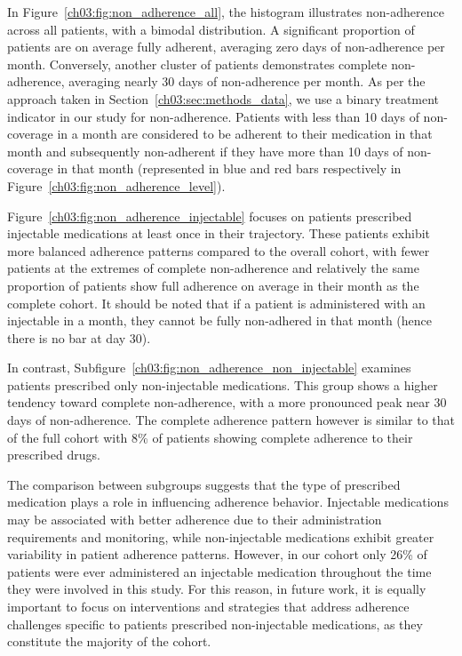 In Figure~\ref{ch03:fig:non_adherence_all}, the histogram illustrates non-adherence across all patients, with a bimodal distribution.
A significant proportion of patients are on average fully adherent, averaging zero days of non-adherence per month.
Conversely, another cluster of patients demonstrates complete non-adherence, averaging nearly 30 days of non-adherence per month.
As per the approach taken in Section~\ref{ch03:sec:methods_data}, we use a binary treatment indicator in our study for non-adherence. 
Patients with less than 10 days of non-coverage in a month are considered to be adherent to their medication in that month and subsequently non-adherent if they have more than 10 days of non-coverage in that month (represented in blue and red bars respectively in Figure~\ref{ch03:fig:non_adherence_level}).

Figure~\ref{ch03:fig:non_adherence_injectable} focuses on patients prescribed injectable medications at least once in their trajectory.
These patients exhibit more balanced adherence patterns compared to the overall cohort, with fewer patients at the extremes of complete non-adherence and relatively the same proportion of patients show full adherence on average in their month as the complete cohort.
It should be noted that if a patient is administered with an injectable in a month, they cannot be fully non-adhered in that month (hence there is no bar at day 30).

In contrast, Subfigure~\ref{ch03:fig:non_adherence_non_injectable} examines patients prescribed only non-injectable medications.
This group shows a higher tendency toward complete non-adherence, with a more pronounced peak near 30 days of non-adherence. 
The complete adherence pattern however is similar to that of the full cohort with 8\% of patients showing complete adherence to their prescribed drugs.

The comparison between subgroups suggests that the type of prescribed medication plays a role in influencing adherence behavior.
Injectable medications may be associated with better adherence due to their administration requirements and monitoring, while non-injectable medications exhibit greater variability in patient adherence patterns.
However, in our cohort only 26\% of patients were ever administered an injectable medication throughout the time they were involved in this study.
For this reason, in future work, it is equally important to focus on interventions and strategies that address adherence challenges specific to patients prescribed non-injectable medications, as they constitute the majority of the cohort.



